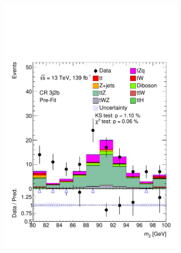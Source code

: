 \begin{figure}[!h]
\begin{subfigure}[b]{0.33\linewidth}
    \includegraphics[width=\linewidth]{ubonn-thesis/Chapters/Chapters_06/Figure/Input_distribution/CR_3j2b_MZ.pdf} 
  \end{subfigure}%
  \begin{subfigure}[b]{0.33\linewidth}
    \centering

\end{subfigure}
\end{figure}
